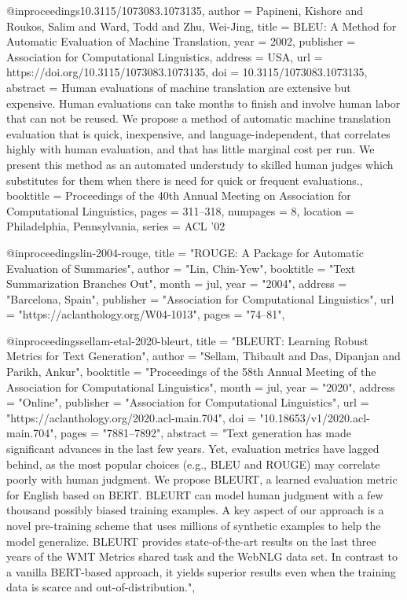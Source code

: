 @inproceedings{10.3115/1073083.1073135,
author = {Papineni, Kishore and Roukos, Salim and Ward, Todd and Zhu, Wei-Jing},
title = {BLEU: A Method for Automatic Evaluation of Machine Translation},
year = {2002},
publisher = {Association for Computational Linguistics},
address = {USA},
url = {https://doi.org/10.3115/1073083.1073135},
doi = {10.3115/1073083.1073135},
abstract = {Human evaluations of machine translation are extensive but expensive. Human evaluations can take months to finish and involve human labor that can not be reused. We propose a method of automatic machine translation evaluation that is quick, inexpensive, and language-independent, that correlates highly with human evaluation, and that has little marginal cost per run. We present this method as an automated understudy to skilled human judges which substitutes for them when there is need for quick or frequent evaluations.},
booktitle = {Proceedings of the 40th Annual Meeting on Association for Computational Linguistics},
pages = {311–318},
numpages = {8},
location = {Philadelphia, Pennsylvania},
series = {ACL '02}
}

@inproceedings{lin-2004-rouge,
    title = "{ROUGE}: A Package for Automatic Evaluation of Summaries",
    author = "Lin, Chin-Yew",
    booktitle = "Text Summarization Branches Out",
    month = jul,
    year = "2004",
    address = "Barcelona, Spain",
    publisher = "Association for Computational Linguistics",
    url = "https://aclanthology.org/W04-1013",
    pages = "74--81",
}

@inproceedings{sellam-etal-2020-bleurt,
    title = "{BLEURT}: Learning Robust Metrics for Text Generation",
    author = "Sellam, Thibault  and
      Das, Dipanjan  and
      Parikh, Ankur",
    booktitle = "Proceedings of the 58th Annual Meeting of the Association for Computational Linguistics",
    month = jul,
    year = "2020",
    address = "Online",
    publisher = "Association for Computational Linguistics",
    url = "https://aclanthology.org/2020.acl-main.704",
    doi = "10.18653/v1/2020.acl-main.704",
    pages = "7881--7892",
    abstract = "Text generation has made significant advances in the last few years. Yet, evaluation metrics have lagged behind, as the most popular choices (e.g., BLEU and ROUGE) may correlate poorly with human judgment. We propose BLEURT, a learned evaluation metric for English based on BERT. BLEURT can model human judgment with a few thousand possibly biased training examples. A key aspect of our approach is a novel pre-training scheme that uses millions of synthetic examples to help the model generalize. BLEURT provides state-of-the-art results on the last three years of the WMT Metrics shared task and the WebNLG data set. In contrast to a vanilla BERT-based approach, it yields superior results even when the training data is scarce and out-of-distribution.",
}











